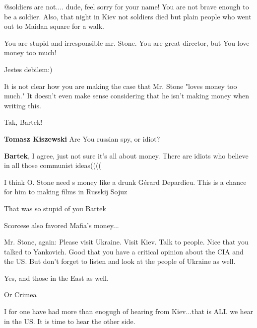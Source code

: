 \begin{itemize}
\begin{itemize}

@soldiers are not.... dude, feel sorry for your name! You are not brave enough
to be a soldier. Also, that night in Kiev not soldiers died but plain people
who went out to Maidan square for a walk.

\end{itemize} %


You are stupid and irresponsible mr. Stone. You are great director, but You
love money too much!

\begin{itemize} %
Jestes debilem:)


It is not clear how you are making the case that Mr. Stone "loves money too
much." It doesn't even make sense considering that he isn't making money when
writing this.


Tak, Bartek!

\textbf{Tomasz Kiszewski} Are You russian spy, or idiot?

\textbf{Bartek}, I agree, just not sure it's all about money. There are idiots who believe in all those communist ideas((((

I think O. Stone need s money like a drunk Gérard Depardieu. This is a chance for him to making films in Russkij Sojuz

That was so stupid of you Bartek

Scorcese also favored Mafia's money...
\end{itemize} %


Mr. Stone, again: Please visit Ukraine. Visit Kiev. Talk to people. Nice that
you talked to Yankovich. Good that you have a critical opinion about the CIA
and the US. But don't forget to listen and look at the people of Ukraine as
well.

\begin{itemize} %
Yes, and those in the East as well.

Or Crimea

I for one have had more than enogugh of hearing from Kiev...that is ALL we hear in the US. It is time to hear the other side.


\end{itemize}
\end{itemize}
